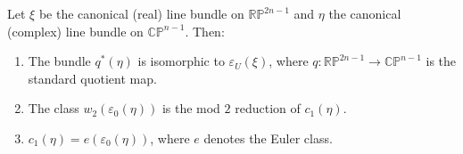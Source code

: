 Let $\xi$ be the canonical (real) line bundle on $\mathbb{RP}^{2n-1}$ and $\eta$ the canonical (complex) line bundle on $\mathbb{CP}^{n-1}$. Then:
\begin{enumerate}
\item[(1)] The bundle $q^*(\eta)$ is isomorphic to $\varepsilon_U(\xi)$, where $q: \mathbb{RP}^{2n-1} \to \mathbb{CP}^{n-1}$ is the standard quotient map.
\item[(2)] The class $w_2(\varepsilon_0(\eta))$ is the mod $2$ reduction of $c_1(\eta)$.
\item[(3)] $c_1(\eta) = e(\varepsilon_0(\eta))$, where $e$ denotes the Euler class.
\end{enumerate}
